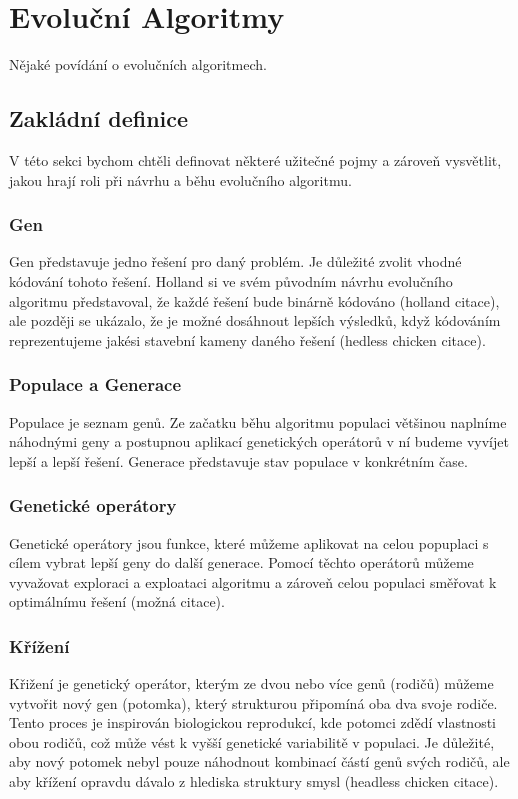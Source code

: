 \chapter{Evoluční Algoritmy}

Nějaké povídání o evolučních algoritmech.

\section{Zakládní definice}
V této sekci bychom chtěli definovat některé užitečné pojmy a zároveň vysvětlit, jakou hrají roli při návrhu a běhu evolučního algoritmu.

\subsection{Gen}
Gen představuje jedno řešení pro daný problém. Je důležité zvolit vhodné kódování tohoto řešení. Holland si ve svém původním návrhu evolučního algoritmu představoval, že každé řešení bude binárně kódováno (holland citace), ale později se ukázalo, že je možné dosáhnout lepších výsledků, když kódováním reprezentujeme jakési stavební kameny daného řešení (hedless chicken citace).

\subsection{Populace a Generace}
Populace je seznam genů. Ze začatku běhu algoritmu populaci většinou naplníme náhodnými geny a postupnou aplikací genetických operátorů v ní budeme vyvíjet lepší a lepší řešení. Generace představuje stav populace v konkrétním čase.

\subsection{Genetické operátory}
Genetické operátory jsou funkce, které můžeme aplikovat na celou popuplaci s cílem vybrat lepší geny do další generace. Pomocí těchto operátorů můžeme vyvažovat exploraci a exploataci algoritmu a zároveň celou populaci směřovat k optimálnímu řešení (možná citace).

\subsection{Křížení}
Křižení je genetický operátor, kterým ze dvou nebo více genů (rodičů) můžeme vytvořit nový gen (potomka), který strukturou připomíná oba dva svoje rodiče. Tento proces je inspirován biologickou reprodukcí, kde potomci zdědí vlastnosti obou rodičů, což může vést k vyšší genetické variabilitě v populaci. Je důležité, aby nový potomek nebyl pouze náhodnout kombinací částí genů svých rodičů, ale aby křížení opravdu dávalo z hlediska struktury smysl (headless chicken citace).

